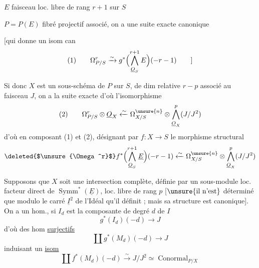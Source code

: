 
$E$ faisceau loc. libre de rang $r+1$ sur $S$

$P=P(E)$ fibré projectif associé, on a une suite exacte canonique

[qui donne un isom can
\[
(1)\qquad\Omega^r_{P/S}\xrightarrow{\sim}g^*\Bigl(\bigwedge_{\underline O_S}^{r+1}E\Bigr)(-r-1)
\qquad]
\]

Si donc $X$ est un sous-schéma de $P$  sur $S$, de dim relative $r-p$
associé au faisceau   $J$, on a la suite exacte
d'où l'isomorphisme
\[
(2)\qquad\Omega^r_{P/S}\otimes\underline O_X
\xleftarrow{\sim}\Omega^{\unsure{n}}_{X/S}\otimes\bigwedge_{\underline O_X}^p(J/J^2)
\]
d'où en composant (1) et (2), désignant par $f:X\to S$
le morphisme structural
\[
\deleted{$\unsure{\Omega^r}$}
f^*\Bigl(\bigwedge_{\underline O_S}^{r+1}\underline E\Bigr)(-r-1)
\xleftarrow{\sim}\Omega^{\unsure{n}}_{X/S}\otimes\bigwedge_{\underline O_X}^p(J/J^2)
\]

Supposons que $X$ soit une intersection complète, définie
par un sous-module  loc. facteur direct de
$\operatorname{Symm}^*(\underline E)$,
\deleted{[qui est \unsure{un}} loc. libre de rang $p$
[$\unsure{\text{il n'est}}$ 
déterminé que modulo le carré $\underline I^2$ de l'Idéal qu'il
définit ; mais sa structure est canonique]. On a
un hom., si $I_d$ est la composante de degré $d$ de $I$
\[
g^*(I_d)(-d)\longrightarrow J
\]
d'où des hom \uline{surjectifs}
\[
\coprod g^*(M_d)(-d)\longrightarrow J
\]
induisant un \uline{isom}
\[
\coprod f^*(M_d)(-d)\xrightarrow{\sim}J/J^2\simeq\operatorname{Conormal}_{P/X}
\]

